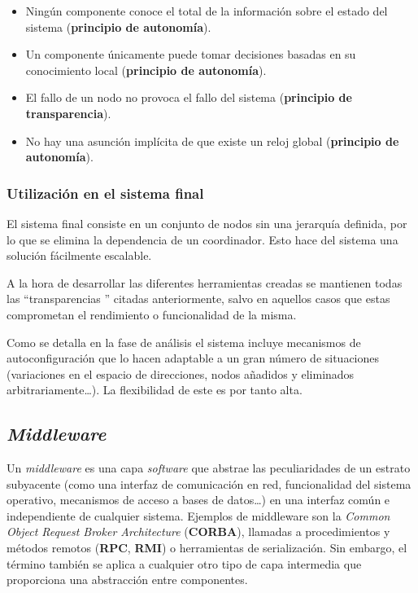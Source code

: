\begin{itemize}
  \item Ningún componente conoce el total de la información sobre el estado del sistema (\textbf{principio de autonomía}).
  \item Un componente únicamente puede tomar decisiones basadas en su conocimiento local (\textbf{principio de autonomía}).
  \item El fallo de un nodo no provoca el fallo del sistema (\textbf{principio de transparencia}).
  \item No hay una asunción implícita de que existe un reloj global (\textbf{principio de autonomía}).
\end{itemize}

\subsubsection{Utilización en el sistema final}

El sistema final consiste en un conjunto de nodos sin una jerarquía definida, por lo que se elimina la dependencia de un coordinador. Esto hace del sistema una solución fácilmente escalable.

A la hora de desarrollar las diferentes herramientas creadas se mantienen todas las  ``transparencias '' citadas anteriormente, salvo en aquellos casos que estas comprometan el rendimiento o funcionalidad de la misma.

Como se detalla en la fase de análisis  el sistema incluye mecanismos de autoconfiguración que lo hacen adaptable a un gran número de situaciones (variaciones en el espacio de direcciones, nodos añadidos y eliminados arbitrariamente\dots). La flexibilidad de este es por tanto alta.


\subsection{\textit{Middleware}}
\label{teoria:middleware}

Un \textit{middleware} es una capa \textit{software} que abstrae las peculiaridades de un estrato subyacente (como una interfaz de comunicación en red, funcionalidad del sistema operativo, mecanismos de acceso a bases de datos\dots) en una interfaz común e independiente de cualquier sistema. Ejemplos de middleware son la \textit{Common Object Request Broker Architecture} (\textbf{CORBA}), llamadas a procedimientos y métodos remotos (\textbf{RPC}, \textbf{RMI}) o herramientas de serialización. Sin embargo, el término también se aplica a cualquier otro tipo de capa intermedia que proporciona una abstracción entre componentes.

